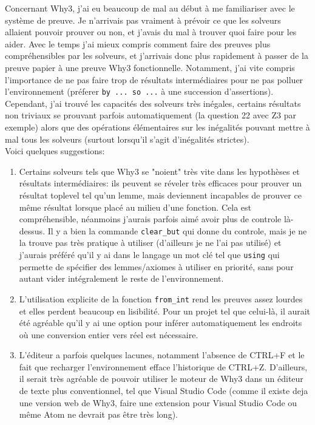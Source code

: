 \documentclass[a4paper]{article}%
\begin{document}
	Concernant Why3, j'ai eu beaucoup de mal au début à me familiariser avec le système de preuve.
	Je n'arrivais pas vraiment à prévoir ce que les solveurs allaient pouvoir prouver ou non,
	et j'avais du mal à trouver quoi faire pour les aider. Avec le temps j'ai mieux compris comment faire des preuves plus compréhensibles
	par les solveurs, et j'arrivais donc plus rapidement à passer de la preuve papier à une preuve Why3 fonctionnelle.
	Notamment, j'ai vite compris l'importance de ne pas faire trop de résultats intermédiaires pour ne pas polluer l'environnement
	(préferer \texttt{by ... so ...} à une succession d'assertions).
	Cependant, j'ai trouvé les capacités des solveurs très inégales, certains résultats non triviaux
	se prouvant parfois automatiquement (la question 22 avec Z3 par exemple) alors que des opérations élémentaires
	sur les inégalités pouvant mettre à mal tous les solveurs (surtout lorsqu'il s'agit d'inégalités strictes).\\

	Voici quelques suggestions:
	\begin{enumerate}
		\item Certains solveurs tels que Why3 se "noient" très vite dans les hypothèses et résultats intermédiaires:
		ils peuvent se réveler très efficaces pour prouver un résultat toplevel tel qu'un lemme,
		mais deviennent incapables de prouver ce même résultat lorsque placé au milieu d'une fonction.
		Cela est compréhensible, néanmoins j'aurais parfois aimé avoir plus de controle là-dessus.
		Il y a bien la commande \texttt{clear_but} qui donne du controle, mais je ne la trouve pas très pratique à utiliser
		(d'ailleurs je ne l'ai pas utilisé) et j'aurais préféré qu'il y ai dans le langage un mot clé tel que \texttt{using}
		qui permette de spécifier des lemmes/axiomes à utiliser en priorité, sans pour autant vider intégralement le reste de l'environnement.
		\item L'utilisation explicite de la fonction \texttt{from_int} rend les preuves assez lourdes et elles perdent beaucoup en lisibilité.
		Pour un projet tel que celui-là, il aurait été agréable qu'il y ai une option pour inférer automatiquement les endroits où une conversion
		entier vers réel est nécessaire.
		\item L'éditeur a parfois quelques lacunes, notamment l'absence de CTRL+F et le fait que recharger l'environnement efface l'historique
		de CTRL+Z. D'ailleurs, il serait très agréable de pouvoir utiliser le moteur de Why3 dans un éditeur de texte plus conventionnel, tel
		que Visual Studio Code (comme il existe deja une version web de Why3, faire une extension pour Visual Studio Code ou même Atom 
		ne devrait pas être très long).
	\end{enumerate}
\end{document}
